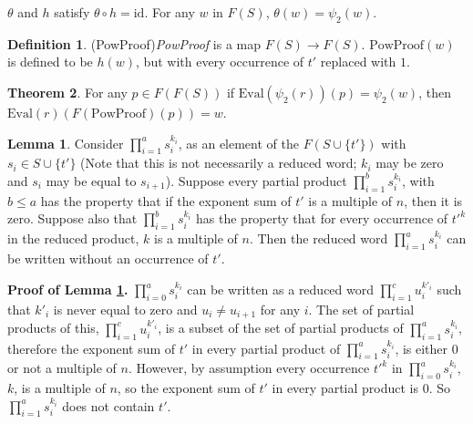 \documentclass[11pt]{article} %
\theoremstyle{definition}
\newtheorem{theorem}{Theorem}[section]
\theoremstyle{definition}
\theoremstyle{definition}
\theoremstyle{definition}
\newtheorem{sublemma}{Lemma}[theorem]
\theoremstyle{definition}
\newtheorem{defn}[theorem]{Definition}
\theoremstyle{definition}
\begin{document}
$\theta$ and $h$ satisfy $\theta \circ h = \text{id}$. For any $w$ in $F(S)$,
$\theta(w) = \psi_2(w)$.

\begin{defn}(PowProof)\label{PowProof}
  \textit{PowProof} is a map $F(S) \to F(S)$. $\text{PowProof}(w)$ is defined to be
  $h(w)$, but with every occurrence of $t'$ replaced with $1$.
\end{defn}

\begin{theorem}\label{powproof}
  For any $p \in F(F(S))$ if \newline $\text{Eval}(\psi_2(r))(p) = \psi_2(w)$,
  then $\text{Eval}(r)(F(\text{PowProof})(p)) = w$.
\end{theorem}

\begin{sublemma}\label{powproof1}
  Consider $\prod_{i = 1}^a s_i^{k_i}$, as an element of the $F(S \cup \{t'\})$
  with $s_i \in S \cup \{t'\}$ (Note that this is not necessarily a reduced
  word; $k_i$ may be zero and $s_i$ may be equal to $s_{i+1}$).
  Suppose every partial product $\prod_{i=1}^b s_i^{k_i}$,
  with $b \le a$ has the property that if the exponent sum of $t'$ is a multiple
  of $n$, then it is zero. Suppose also that $\prod_{i = 1}^b s_i^{k_i}$ has the
  property that for every occurrence of $t'^k$ in the reduced product, $k$ is a multiple of
  $n$. Then the reduced word $\prod_{i = 1}^a s_i^{k_i}$
  can be written without an occurrence of $t'$.
\end{sublemma}

\textbf{Proof of Lemma \ref{powproof1}.} $\prod_{i=0}^a s_i^{k_i}$ can be written as a reduced
word $\prod_{i = 1}^{c} u_i^{k'_i}$ such that $k'_i$ is never equal to zero and
$u_i \ne u_{i+1}$ for any $i$. The set of partial products of this,
$\prod_{i = 1}^{c} u_i^{k'_i}$, is a subset of the set of partial products of
$\prod_{i=1}^a s_i^{k_i}$,
therefore the exponent sum of $t'$ in every partial product of $\prod_{i=1}^a s_i^{k_i}$, is
either $0$ or not a multiple of $n$. However, by assumption every occurrence $t'^k$ in
$\prod_{i=0}^a s_i^{k_i}$, $k$, is a multiple of $n$, so the exponent sum of $t'$ in every
partial product is $0$. So $\prod_{i=1}^a s_i^{k_i}$ does not contain $t'$.
\end{document}
